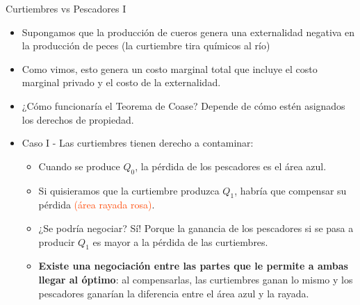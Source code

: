 \documentclass{beamer}
\begin{document}
\begin{frame}{Curtiembres vs Pescadores I}
\begin{itemize}
    \item Supongamos que la producción de cueros genera una externalidad negativa en la producción de peces (la curtiembre tira químicos al río) \vspace{1mm}
    \item Como vimos, esto genera un costo marginal total que incluye el costo marginal privado y el costo de la externalidad.\vspace{1mm}
    \item ¿Cómo funcionaría el Teorema de Coase? Depende de cómo estén asignados los derechos de propiedad.
    \vspace{1mm}
    \item Caso I - Las curtiembres tienen derecho a contaminar:
    \begin{itemize}
        \item Cuando se produce $Q_0$, la pérdida de los pescadores es el \textcolor{blue!50}{área azul}.  
        \item Si quisieramos que la curtiembre produzca $Q_1$, habría que compensar su pérdida \textcolor{OrangeRed}{(área rayada rosa)}.
        \item ¿Se podría negociar? Sí! Porque la ganancia de los pescadores si se pasa a producir $Q_1$ es mayor a la pérdida de las curtiembres. 
        \item \textbf{Existe una negociación entre las partes que le permite a ambas llegar al óptimo}: al compensarlas, las curtiembres  ganan lo mismo  y los pescadores ganarían la diferencia entre el área azul y la rayada.
    \end{itemize}
\end{itemize}
\end{frame}
\end{document}
